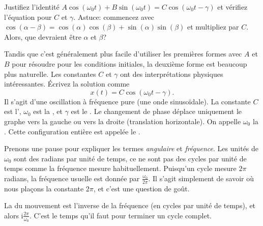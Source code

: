 \begin{exercise}
Justifiez l'identité  
	$A \cos (\omega_0 t) + B \sin (\omega_0 t) = C \cos ( \omega_0 t - \gamma )$ 
	et vérifiez l'équation pour $C$ et $\gamma$.  
	Astuce: commencez avec  
	$\cos (\alpha-\beta) = \cos (\alpha) \cos (\beta) + \sin (\alpha)\sin (\beta)$ 
	et multipliez par $C$.  Alors, que devraient être $\alpha$ et $\beta$?
\end{exercise}

Tandis que c'est généralement plus facile d'utiliser les premières formes avec  $A$ et $B$
pour résoudre pour les conditions initiales, la deuxième forme est beaucoup plus naturelle. 
Les constantes $C$ et $\gamma$ ont des interprétations physiques intéressantes. 
Écrivez la solution comme
\begin{equation*}
	x(t) = C \cos ( \omega_0 t - \gamma ) .
\end{equation*}
Il s'agit d'une oscillation à fréquence pure (une onde sinusoïdale).
La constante  $C$ est l'\emph{}, $\omega_0$ est la 
\emph{},
et $\gamma$ est le \emph{}.
Le changement de phase déplace uniquement le graphe vers la gauche ou vers la droite (translation horizontale). 
On appelle $\omega_0$ la \emph{}.
Cette configuration entière est
appelée le \emph{}.

Prenons une pause pour expliquer les termes \emph{angulaire} et \emph{fréquence}.
Les unités de $\omega_0$ sont des radians par unité de temps, ce ne sont pas des cycles par unité de temps comme la fréquence mesure habituellement. Puisqu'un cycle mesure $2
\pi$ radians, la fréquence usuelle est donnée par  $\frac{\omega_0}{2\pi}$.
Il s'agit simplement de savoir où nous plaçons la constante $2\pi$, 
et c'est une question de goût.

La \emph{} du mouvement est l'inverse de la fréquence  (en cycles par unité de temps), et alors i$\frac{2\pi}{\omega_0}$. C'est le temps qu'il faut pour terminer un cycle complet.


